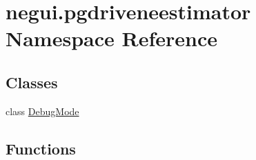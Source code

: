 \hypertarget{namespacenegui_1_1pgdriveneestimator}{}\section{negui.\+pgdriveneestimator Namespace Reference}
\label{namespacenegui_1_1pgdriveneestimator}
\subsection*{Classes}
\begin{DoxyCompactItemize}
\item 
class \hyperlink{classnegui_1_1pgdriveneestimator_1_1DebugMode}{Debug\+Mode}
\end{DoxyCompactItemize}
\subsection*{Functions}
